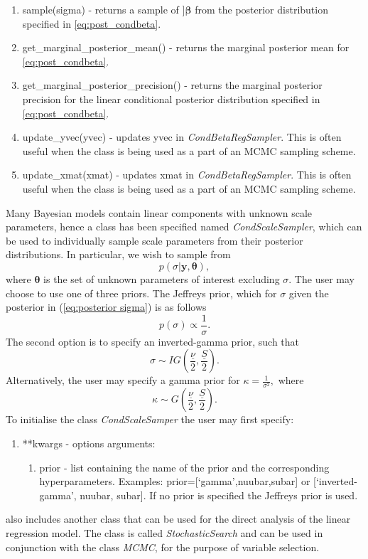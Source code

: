 \documentclass[article]{jss}
\begin{document}
\begin{enumerate}

\item sample(sigma) - returns a sample of $]\bm{\beta}$ from the posterior
distribution specified in \ref{eq:post_condbeta}.
\item get\_marginal\_posterior\_mean() - returns the marginal posterior
  mean for \ref{eq:post_condbeta}.
\item get\_marginal\_posterior\_precision() - returns the marginal posterior
  precision for the linear conditional posterior distribution specified in \ref{eq:post_condbeta}.
\item update\_yvec(yvec) - updates yvec in \emph{CondBetaRegSampler}. This
  is often useful when the class is being used as a part of an MCMC 
  sampling scheme.
\item update\_xmat(xmat) - updates xmat in \emph{CondBetaRegSampler}. This
  is often useful when the class is being used as a part of an MCMC 
  sampling scheme.
\end{enumerate}
Many Bayesian models contain linear components with unknown scale
parameters, hence a class has been specified named \emph{CondScaleSampler},
which can be used to individually sample scale parameters from their
posterior distributions. In particular, we wish to sample from
\begin{equation} p(\sigma|\bm{y},\bm{\theta}),\label{eq:posterior
    sigma}
\end{equation} where $\bm{\theta}$ is the set of unknown
parameters of interest excluding $\sigma.$ The user may choose to use
one of three priors.  The Jeffreys prior, which for $\sigma$ given
the posterior in (\ref{eq:posterior sigma}) is as follows \[
p(\sigma)\propto\frac{1}{\sigma}.\] The second option is to specify an
inverted-gamma prior, such that\[ \sigma\sim
IG\left(\frac{\underline{\nu}}{2},\frac{\underline{S}}{2}\right).\]
Alternatively, the user may specify a gamma prior for
$\kappa=\frac{1}{\sigma^{2}},$ where\[ \kappa\sim
G\left(\frac{\underline{\nu}}{2},\frac{\underline{S}}{2}\right).\] To
initialise the class \emph{CondScaleSamper} the user may first
specify:
\begin{enumerate}
\item {*}{*}kwargs - options arguments:
\begin{enumerate}
\item prior - list containing the name of the prior and the
  corresponding hyperparameters. Examples:
  prior={[}`gamma',nuubar,subar{]} or {[}`inverted-gamma', nuubar,
  subar{]}. If no prior is specified the Jeffreys prior is used.
\end{enumerate}
\end{enumerate}
 also includes another class that can be used for the
direct analysis of the linear regression model. The class is called
\emph{StochasticSearch} and can be used in conjunction with the
class \emph{MCMC}, for the purpose of variable selection.
\end{document}
